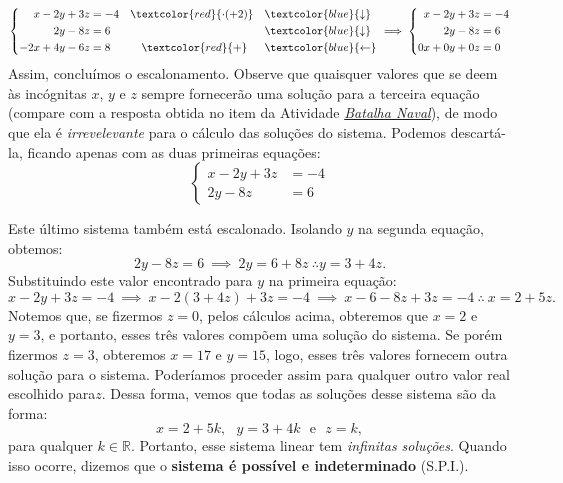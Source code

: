 \begin{example}{}
\begin{equation*}
\left \{
\begin{aligned}
x-2y+3z&=-4 &&\textcolor{red}{\cdot(+2)} &&\vspace{1ex}\textcolor{blue}{\downarrow}\\
2y-8z&=6 &&&&\vspace{1ex}\textcolor{blue}{\downarrow}\\
-2x+4y-6z&=8 &&\quad\textcolor{red}{+}  &&\textcolor{blue}{\leftarrow}
\end{aligned}
\right.
\implies
\left \{
\begin{aligned}
x-2y+3z&=-4\\
2y-8z&=6\\
0x+0y+0z&=0
\end{aligned}
\right.
\end{equation*}
Assim, concluímos o escalonamento. Observe que quaisquer valores que se deem às incógnitas $x$, $y$ e $z$ sempre fornecerão uma solução para a terceira equação (compare com a resposta obtida no item  da Atividade \hyperref[batalha-naval]{\textit{Batalha Naval}}), de modo que ela é \emph{irrevelevante} para o cálculo das soluções do sistema. Podemos descartá-la, ficando apenas com as duas primeiras equações:
\begin{equation*}
\left \{
\begin{aligned}
x-2y+3z&=-4\\
2y-8z&=6
\end{aligned}
\right.
\end{equation*}

Este último sistema também está escalonado. Isolando $y$ na segunda equação, obtemos:
$$
2y - 8z = 6 \ \implies \ 2y = 6 + 8z \ \therefore y = 3 + 4z.
$$
Substituindo este valor encontrado para $y$ na primeira equação:
$$
x - 2y +3z = -4 \ \implies \ x -2(3+4z) + 3z = -4 \ \implies \ x -6 - 8z +3z = -4 \ \therefore \ x = 2 +5z.
$$
Notemos que, se fizermos $z = 0$, pelos cálculos acima, obteremos que $x = 2$ e $y = 3$, e portanto, esses três valores compõem uma solução do sistema. Se porém fizermos $z = 3$, obteremos $x = 17$ e $y = 15$, logo, esses três valores fornecem outra solução para o sistema. Poderíamos proceder assim para qualquer outro valor real escolhido para$z$. Dessa forma, vemos que todas as soluções desse sistema são da forma:
$$
x = 2 + 5k, \ \ \ y = 3 + 4k \ \ \ \mbox{e} \ \ \ z = k, 
$$   
para qualquer $k \in \mathbb{R}$. Portanto, esse sistema linear tem \emph{infinitas soluções}. Quando isso ocorre, dizemos que o \textbf{sistema é possível e indeterminado} (S.P.I.).
\end{example}

